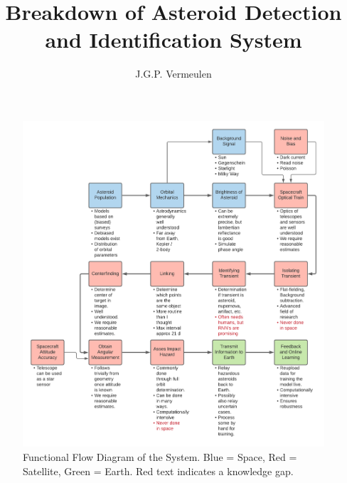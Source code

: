 \documentclass[a4paper,10pt]{article}
\title{Breakdown of Asteroid Detection and Identification System}
\author{J.G.P. Vermeulen}
\begin{document}
\maketitle
\begin{figure}[h!]
\centering
\includegraphics[width=1.0\textwidth]{functional_flow.png}
\caption{Functional Flow Diagram of the System. Blue = Space, Red = Satellite, Green = Earth. Red text indicates a knowledge gap.}
\label{fig:FFD}
\end{figure}
\end{document}
